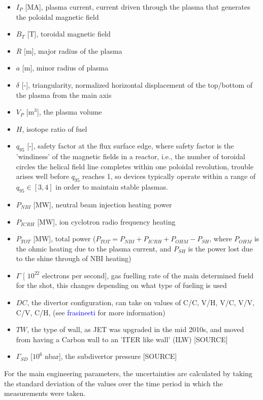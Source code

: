 \documentclass[a4paper, twoside, final, 12pt]{article}
\begin{document}
\begin{itemize}
	\item $I_P$ [MA], plasma current, current driven through the plasma that generates the poloidal magnetic field
	\item $B_T$ [T], toroidal magnetic field 
	\item $R$ [m], major radius of the plasma
	\item $a$ [m], minor radius of plasma
	\item $\delta$ [-], triangularity, normalized horizontal displacement of the top/bottom of the plasma from the main axis
	\item $V_P$ [m$^3$], the plasma volume
	\item $H$, isotope ratio of fuel

	\item $q_{95}$ [-], safety factor at the flux surface edge, where safety factor is the 'windiness' of the magnetic fields in a reactor, i.e., the  number of toroidal circles the helical field line completes within one poloidal revolution, trouble arises well before $q_{95}$ reaches 1, so devices typically operate within a range of $q_{95} \in [3, 4]$ in order to maintain stable plasmas.
	\item $P_{NBI}$ [MW], neutral beam injection heating power
	\item $P_{ICRH}$ [MW], ion cyclotron radio frequency heating 
	\item $P_{TOT}$ [MW], total power ($P_{TOT} = P_{NBI}+ P_{ICRH} + P_{OHM} - P_{SH}$, where $P_{OHM}$ is the ohmic heating due to the plasma current, and $P_{SH}$ is the power lost due to the shine through of NBI heating)
	\item $\Gamma$ [ $10^{22}$ electrons per second], gas fuelling rate of the main determined fueld for the shot, this changes depending on what type of fueling is used 
	\item $DC$, the divertor configuration, can take on values of C/C, V/H, V/C, V/V, C/V, C/H, (see \textcolor{blue}{frasineeti} for more information)
	\item $TW$, the type of wall, as JET was upgraded in the mid 2010s, and moved from having a Carbon wall to an 'ITER like wall' (ILW) [SOURCE]
	\item $\Gamma_{SD}$ [$10^6$ nbar], the subdivertor pressure [SOURCE]
\end{itemize}

For the main engineering parameters, the uncertainties are calculated by taking the standard deviation of the values over the time period in which the measurements were taken. 
\end{document}
